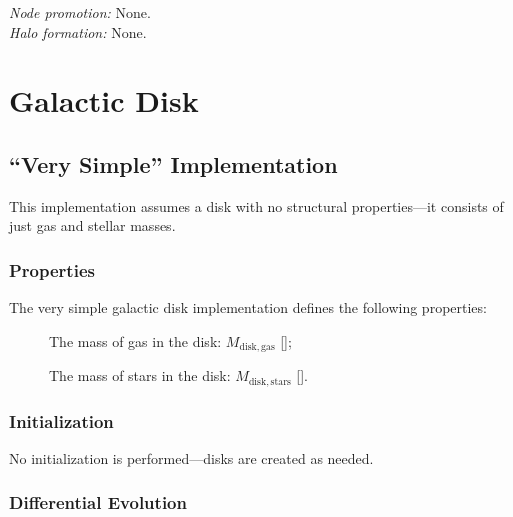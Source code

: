 \noindent\emph{Node promotion:} None.\\ 

\noindent\emph{Halo formation:} None.\\

\section{Galactic Disk}

\subsection{``Very Simple'' Implementation}

This implementation assumes a disk with no structural properties---it consists of just gas and stellar masses.

\subsubsection{Properties}

The very simple galactic disk implementation defines the following properties:
\begin{description}
 \item [] The mass of gas in the disk: $M_\mathrm{disk, gas}$ [];
 \item [] The mass of stars in the disk: $M_\mathrm{disk, stars}$ [].
\end{description}

\subsubsection{Initialization}

No initialization is performed---disks are created as needed.

\subsubsection{Differential Evolution}

